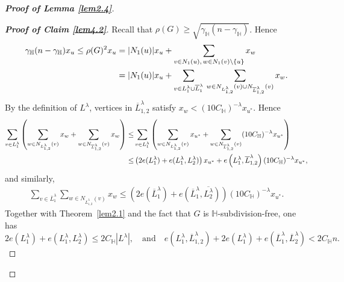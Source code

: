 \documentclass[11pt, a4paper]{article}
\theoremstyle{definition}
\newcommand{\<}{\subseteq}
\begin{document}
\begin{proof}[\bf Proof of Lemma \ref{lem2.4}]
\begin{proof}[\bf Proof of Claim \ref{lem4.2}]
    Recall that \( \rho(G) \geq \sqrt{\gamma_\mathbb{H}(n-\gamma_\mathbb{H})} \). Hence 
    \begin{align}\notag
        \gamma_\mathbb{H}(n-\gamma_\mathbb{H})x_u \leq \rho(G)^2x_u &= |N_1(u)|x_u + \sum_{\substack{v \in N_1(u),\,w \in N_1(v)\setminus\{u\}}} x_w\\\label{eq:6}
        &= |N_1(u)|x_u + \sum_{v\in L_1^\lambda \cup \overline{L}_1^\lambda}\,\sum_{\substack{w \in N_{L_{1,2}^\lambda}(v) \cup N_{\overline{L}_{1,2}^\lambda}(v)}} x_w.
    \end{align}   
   By the definition of \( L^\lambda \), vertices in \( \overline{L}_{1,2}^\lambda \) satisfy \( x_w < (10C_\mathbb{H})^{-\lambda}x_{u^*} \). Hence 
    \begin{align}\notag
        \sum_{v \in L_1^\lambda}\left(\sum_{w \in N_{L_{1,2}^\lambda}(v)} x_w + \sum_{w \in N_{\overline{L}_{1,2}^\lambda}(v)} x_w\right) 
        \leq &\sum_{v \in L_1^\lambda}\left(\sum_{w \in N_{L_{1,2}^\lambda}(v)} x_{u^*} + \sum_{w \in N_{\overline{L}_{1,2}^\lambda}(v)} (10C_\mathbb{H})^{-\lambda}x_{u^*}\right) \\\label{eq:7}
        \leq &\left(2e(L_1^\lambda) + e(L_1^\lambda, L_2^\lambda)\right)x_{u^*} + e\left(L_1^\lambda, \overline{L}_{1,2}^\lambda\right)(10C_\mathbb{H})^{-\lambda}x_{u^*},
    \end{align}
 and similarly, 
    \begin{align}\label{eq:8}
        \sum_{v \in \overline{L}_1^\lambda}\sum_{w \in N_{\overline{L}_{1,2}^\lambda}(v)} x_w\leq  \left(2e(\overline{L}_1^\lambda) + e(\overline{L}_1^\lambda, \overline{L_2^\lambda})\right)(10C_\mathbb{H})^{-\lambda}x_{u^*}.
    \end{align}
Together with Theorem~\ref{lem2.1} and the fact that $G$ is $\mathbb{H}$-subdivision-free, one has %
    \[
    2e(L_1^\lambda) + e(L_1^\lambda, L_2^\lambda) \leq 2C_\mathbb{H}|L^\lambda|, \quad \text{and} \quad e\left(L_1^\lambda, \overline{L}_{1,2}^\lambda\right) + 2e(L_1^\lambda) + e\left(\overline{L}_1^\lambda, \overline{L}_2^\lambda\right) < 2C_\mathbb{H}n.
    \]
    

\end{proof}
\end{proof}
\end{document}
